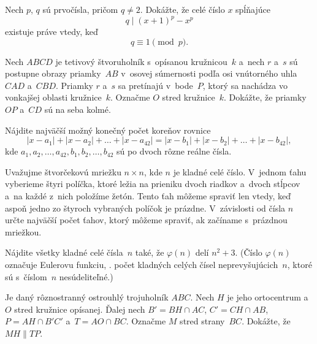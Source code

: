 {%
Nech $p$, $q$ sú prvočísla, pričom $q\ne2$. Dokážte, že celé číslo $x$ spĺňajúce
$$
q \mid (x+1)^p-x^p
$$
existuje práve vtedy, keď $$q \equiv 1 \pmod p.$$
}

{%
Nech $ABCD$ je tetivový štvoruholník s~opísanou kružnicou~$k$ a~nech $r$ a~$s$ sú postupne obrazy priamky~$AB$ v~osovej súmernosti podľa osi vnútorného uhla $CAD$ a~$CBD$. Priamky $r$ a~$s$ sa pretínajú v~bode~$P$, ktorý sa nachádza vo vonkajšej oblasti kružnice~$k$. Označme $O$ stred kružnice~$k$. Dokážte, že priamky $OP$ a~$CD$ sú na seba kolmé.}

{%
Nájdite najväčší možný konečný počet koreňov rovnice
$$|x - a_1| + |x - a_2| + \dots + |x - a_{42}| = |x - b_1| + |x - b_2| + \dots + |x - b_{42}|,
$$
kde $a_1,a_2,\dots,a_{42},b_1,b_2,\dots,b_{42}$ sú po dvoch rôzne reálne čísla.
}

{%
Uvažujme štvorčekovú mriežku $n \times n$, kde $n$ je kladné celé číslo. V~jednom ťahu vyberieme štyri políčka, ktoré ležia na prieniku dvoch riadkov a~dvoch stĺpcov a~na každé z~nich položíme žetón. Tento ťah môžeme spraviť len vtedy, keď aspoň jedno zo štyroch vybraných políčok je prázdne. V~závislosti od čísla $n$ určte najväčší počet ťahov, ktorý môžeme spraviť, ak začíname s~prázdnou mriežkou.}

{%
Nájdite všetky kladné celé čísla~$n$ také, že $\varphi(n)$ delí $n^2 + 3$.
(Číslo $\varphi(n)$ označuje Eulerovu funkciu, \tj. počet kladných celých čísel neprevyšujúcich~$n$, ktoré sú s~číslom~$n$ nesúdeliteľné.)
}

{%
Je daný rôznostranný ostrouhlý trojuholník $ABC$. Nech $H$ je jeho ortocentrum a~$O$ stred kružnice opísanej. Ďalej nech $B' = BH \cap AC$, $C' = CH \cap AB$, $P = AH \cap B'C'$ a~$T = AO \cap BC$. Označme $M$ stred strany~$BC$. Dokážte, že $MH \parallel TP$.}

